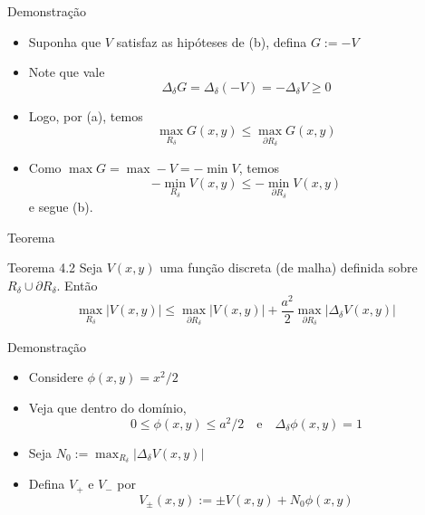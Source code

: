 \documentclass{beamer}
\newcommand{\dR}{\partial R}
\begin{document}
\begin{frame}{Demonstração}
\begin{itemize}[<+->]
    \item Suponha que $V$ satisfaz as hipóteses de (b), defina $G := -V$
    \item Note que vale
    \[
        \Delta_\delta G =  \Delta_\delta (-V) =  -\Delta_\delta V \ge 0
    \]
    \item Logo, por (a), temos 
    \[
      \max_{R_\delta} G(x,y) \le \max_{\dR_\delta} G(x,y)
    \]
    \item Como $\max G = \max -V = -\min V$, temos 
    \[
    -\min_{R_\delta} V(x,y) \le -\min_{\dR_\delta} V(x,y)
    \]
    e segue (b).
\end{itemize}
\end{frame}

\begin{frame}{Teorema}
\begin{block}{Teorema 4.2}
Seja $V(x,y)$ uma função discreta (de malha) definida sobre $R_\delta\cup\dR_\delta$. Então
\begin{equation*}\tag{4.20}
\max_{R_\delta} |V(x,y)| \le \max_{\dR_\delta} |V(x,y)| + \frac{a^2}{2}\max_{\dR_\delta}|\Delta_\delta V(x,y)|    
\end{equation*}
\end{block}
\end{frame}

\begin{frame}{Demonstração}
    \begin{itemize}[<+->]
        \item Considere $\phi(x,y) = x^2/2$
        \item Veja que dentro do domínio,
        \[0\le \phi(x,y)\le a^2/2\quad\text{e}\quad\Delta_\delta \phi(x,y) = 1\]
        \item Seja $N_0 := \max_{R_\delta} |\Delta_\delta V(x,y)|$
        \item Defina $V_+$ e $V_-$ por 
        \[
        V_\pm(x,y) := \pm V(x,y) + N_0\phi(x,y)
        \]
    \end{itemize}
\end{frame}
\end{document}
